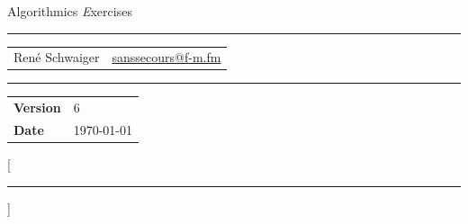 \documentclass[a4paper, 12pt]{report}
\makeatletter
\newcommand{\Title}{Algorithmics}
\newcommand{\TitleDescription}{Exercises}
\newcommand{\Version}{6}
\newcommand{\AuthorOne}{René Schwaiger}
\newcommand{\MailOne}{\href{mailto:sanssecours@f-m.fm}{sanssecours@f-m.fm}}
\makeatother
\begin{document}
\begin{titlepage}

    \begin{center}
        {\Huge\Zapfino \Title}
        \vskip 0.5cm
        {\Large\textit\TitleDescription}
        \vskip 1cm
        \hrule
        \vskip 0.5cm
        \begin{tabular}{p{8cm}l}
            \AuthorOne  & \MailOne\\
        \end{tabular}
        \vskip 0.5cm
        \hrule
        \vskip 13.5cm
    \end{center}

    \begin{leftbar}
        \begin{tabular}{ll}
            \textbf{Version}    & \Version\\
            \textbf{Date}       & \today
        \end{tabular}
    \end{leftbar}

\end{titlepage}


\titlespacing*{\chapter}{0pt}{-30pt}{10pt}
\titleformat{\chapter}{\sffamily\bfseries\large}{}{0pt}{}[{\color{aqua}\hrule}]

\makeatletter \renewcommand{\@dotsep}{10000} \makeatother
\pagestyle{empty}
\newpage
\setcounter{page}{2}

\tableofcontents
\thispagestyle{empty}

\end{document}
